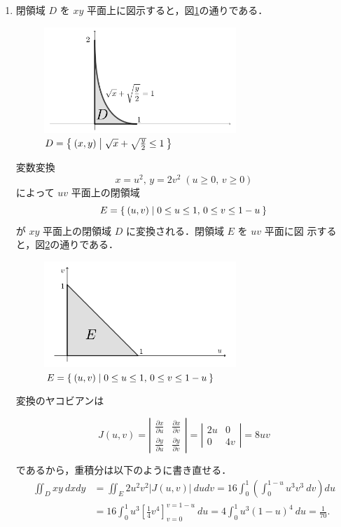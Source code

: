 \documentclass[11pt, uplatex, dvipdfmx]{jsarticle}
\begin{document}
\begin{enumerate}[(1)]
   \item 閉領域 $D$ を $xy$ 平面上に図示すると，図\ref{fig:no13}の通りである．
     \begin{figure}[h]
       \centering
       \includegraphics[height=4cm]{./pictures/no13.pdf}
       \caption{$D=\Set{ (x,y)  |  \sqrt{x} + \sqrt{\frac{y}{2}} \leq 1}$}\label{fig:no13}     
     \end{figure}

     変数変換
     \[
       x=u^2, \, y= 2v^2 \; (u \geq 0 , \, v \geq 0 )
     \]
     によって $uv$ 平面上の閉領域
     \[
       E= \Set{ (u,v)  |   0 \leq u \leq 1, \, 0 \leq v \leq 1-u }
     \]
     が $xy$ 平面上の閉領域 $D$ に変換される．閉領域 $E$ を $uv$ 平面に図
     示すると，図\ref{fig:no13uv}の通りである．
     \begin{figure}[h]
       \centering
       \includegraphics[height=4cm]{./pictures/no13uv.pdf}
       \caption{$E=\Set{(u,v)  |  0 \leq u \leq 1, \, 0 \leq v \leq 1-u}$}\label{fig:no13uv}
     \end{figure}

     変換のヤコビアンは
     \begin{spacing}{1.3}
       \[
         J(u,v) = \left|
           \begin{array}{cc}
             \frac{\partial x}{\partial u} & \frac{\partial x}{\partial v}\\
             \frac{\partial y}{\partial u} & \frac{\partial y}{\partial v}          
           \end{array}
         \right| = \left|
           \begin{array}{cc}
             2u & 0\\
             0 & 4v
           \end{array}
         \right| = 8uv
       \]
     \end{spacing}
     であるから，重積分は以下のように書き直せる．
       \begin{align*}
         \iint_D xy \ dx dy
         &= \iint_E 2u^2 v^2 |J(u,v)| \ du dv = 16 \int_{0}^{1} \left( \int_{0}^{1-u} u^3 v^3 \ dv \right) du\\
         &= 16 \int_{0}^{1} u^3 \left[\frac{1}{4} v^4\right]_{v=0}^{v=1-u} \ du
           =4 \int_{0}^{1} u^3(1-u)^4 \ du =\frac{1}{70}.
       \end{align*}


\end{enumerate}
\end{document}
